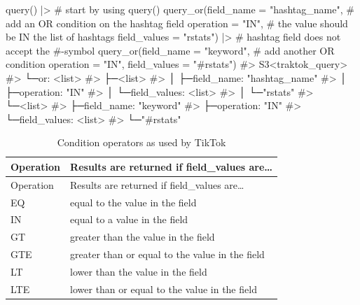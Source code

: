 \documentclass[
  nobib]{ccr}
\newenvironment{Shaded}{\begin{snugshade}}{\end{snugshade}}
\newcommand{\AttributeTok}[1]{\textcolor[rgb]{0.40,0.45,0.13}{#1}}
\newcommand{\CommentTok}[1]{\textcolor[rgb]{0.37,0.37,0.37}{#1}}
\newcommand{\FunctionTok}[1]{\textcolor[rgb]{0.28,0.35,0.67}{#1}}
\newcommand{\NormalTok}[1]{\textcolor[rgb]{0.00,0.23,0.31}{#1}}
\newcommand{\SpecialCharTok}[1]{\textcolor[rgb]{0.37,0.37,0.37}{#1}}
\newcommand{\StringTok}[1]{\textcolor[rgb]{0.13,0.47,0.30}{#1}}
\begin{document}
\begin{Shaded}
\begin{Highlighting}[]
\FunctionTok{query}\NormalTok{() }\SpecialCharTok{|\textgreater{}}                              \CommentTok{\# start by using query()}
  \FunctionTok{query\_or}\NormalTok{(}\AttributeTok{field\_name =} \StringTok{"hashtag\_name"}\NormalTok{, }\CommentTok{\# add an OR condition on the hashtag field}
           \AttributeTok{operation =} \StringTok{"IN"}\NormalTok{,            }\CommentTok{\# the value should be IN the list of hashtags}
           \AttributeTok{field\_values =} \StringTok{"rstats"}\NormalTok{) }\SpecialCharTok{|\textgreater{}}  \CommentTok{\# hashtag field does not accept the \#{-}symbol}
  \FunctionTok{query\_or}\NormalTok{(}\AttributeTok{field\_name =} \StringTok{"keyword"}\NormalTok{,      }\CommentTok{\# add another OR condition}
           \AttributeTok{operation =} \StringTok{"IN"}\NormalTok{,}
           \AttributeTok{field\_values =} \StringTok{"\#rstats"}\NormalTok{)}
\CommentTok{\#\textgreater{} S3\textless{}traktok\_query\textgreater{}}
\CommentTok{\#\textgreater{} └─or: \textless{}list\textgreater{}}
\CommentTok{\#\textgreater{}   ├─\textless{}list\textgreater{}}
\CommentTok{\#\textgreater{}   │ ├─field\_name: "hashtag\_name"}
\CommentTok{\#\textgreater{}   │ ├─operation: "IN"}
\CommentTok{\#\textgreater{}   │ └─field\_values: \textless{}list\textgreater{}}
\CommentTok{\#\textgreater{}   │   └─"rstats"}
\CommentTok{\#\textgreater{}   └─\textless{}list\textgreater{}}
\CommentTok{\#\textgreater{}     ├─field\_name: "keyword"}
\CommentTok{\#\textgreater{}     ├─operation: "IN"}
\CommentTok{\#\textgreater{}     └─field\_values: \textless{}list\textgreater{}}
\CommentTok{\#\textgreater{}       └─"\#rstats"}
\end{Highlighting}
\end{Shaded}

\begin{longtable}[]{@{}ll@{}}
\caption{Condition operators as used by
TikTok}\label{tbl-match}\tabularnewline
\toprule\noalign{}
Operation & Results are returned if field\_values are\ldots{} \\
\midrule\noalign{}
\endfirsthead
\toprule\noalign{}
Operation & Results are returned if field\_values are\ldots{} \\
\midrule\noalign{}
\endhead
\bottomrule\noalign{}
\endlastfoot
EQ & equal to the value in the field \\
IN & equal to a value in the field \\
GT & greater than the value in the field \\
GTE & greater than or equal to the value in the field \\
LT & lower than the value in the field \\
LTE & lower than or equal to the value in the field \\
\end{longtable}
\end{document}
